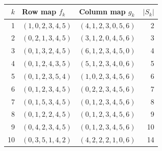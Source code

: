\begin{center}
\small
\begin{tabular}{rllr}
\toprule
$k$ & Row map $f_k$ & Column map $g_k$ & $|S_k|$\\
\midrule
1 & $(1,0,2,3,4,5)$ & $(4,1,2,3,0,5,6)$ & 2\\
2 & $(0,2,1,3,4,5)$ & $(3,1,2,0,4,5,6)$ & 3\\
3 & $(0,1,3,2,4,5)$ & $(6,1,2,3,4,5,0)$ & 4\\
4 & $(0,1,2,4,3,5)$ & $(5,1,2,3,4,0,6)$ & 5\\
5 & $(0,1,2,3,5,4)$ & $(1,0,2,3,4,5,6)$ & 6\\
6 & $(0,1,2,3,4,5)$ & $(0,2,2,3,4,5,6)$ & 7\\
7 & $(0,1,5,3,4,5)$ & $(0,1,2,3,4,5,6)$ & 8\\
8 & $(0,1,2,2,4,5)$ & $(0,1,2,3,4,5,6)$ & 9\\
9 & $(0,4,2,3,4,5)$ & $(0,1,2,3,4,5,6)$ & 10\\
10 & $(0,3,5,1,4,2)$ & $(4,2,2,2,1,0,6)$ & 14\\
\bottomrule
\end{tabular}
\end{center}
